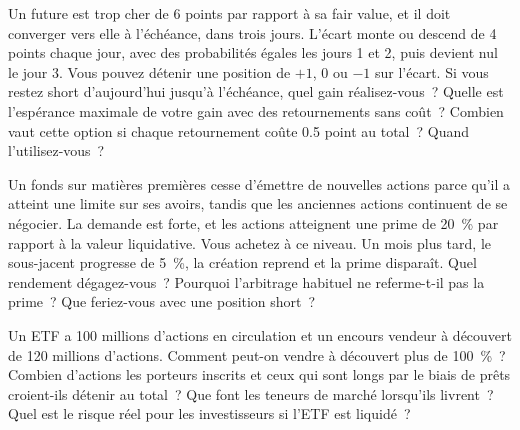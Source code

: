 \begin{question}\label{iq:iv2:etfs-futures-and-index-arbitrage:30}
Un future est trop cher de 6 points par rapport à sa fair value, et il doit converger vers elle à l'échéance, dans trois jours. L'écart monte ou descend de 4 points chaque jour, avec des probabilités égales les jours 1 et 2, puis devient nul le jour 3. Vous pouvez détenir une position de $+1$, $0$ ou $-1$ sur l'écart. Si vous restez short d'aujourd'hui jusqu'à l'échéance, quel gain réalisez-vous~? Quelle est l'espérance maximale de votre gain avec des retournements sans coût~? Combien vaut cette option si chaque retournement coûte 0.5 point au total~? Quand l'utilisez-vous~?
\end{question}

\begin{question}\label{iq:iv2:etfs-futures-and-index-arbitrage:31}
Un fonds sur matières premières cesse d'émettre de nouvelles actions parce qu'il a atteint une limite sur ses avoirs, tandis que les anciennes actions continuent de se négocier. La demande est forte, et les actions atteignent une prime de 20~\% par rapport à la valeur liquidative. Vous achetez à ce niveau. Un mois plus tard, le sous-jacent progresse de 5~\%, la création reprend et la prime disparaît. Quel rendement dégagez-vous~? Pourquoi l'arbitrage habituel ne referme-t-il pas la prime~? Que feriez-vous avec une position short~?
\end{question}

\begin{question}\label{iq:iv2:etfs-futures-and-index-arbitrage:32}
Un ETF a 100 millions d'actions en circulation et un encours vendeur à découvert de 120 millions d'actions. Comment peut-on vendre à découvert plus de 100~\%~? Combien d'actions les porteurs inscrits et ceux qui sont longs par le biais de prêts croient-ils détenir au total~? Que font les teneurs de marché lorsqu'ils livrent~? Quel est le risque réel pour les investisseurs si l'ETF est liquidé~?
\end{question}

